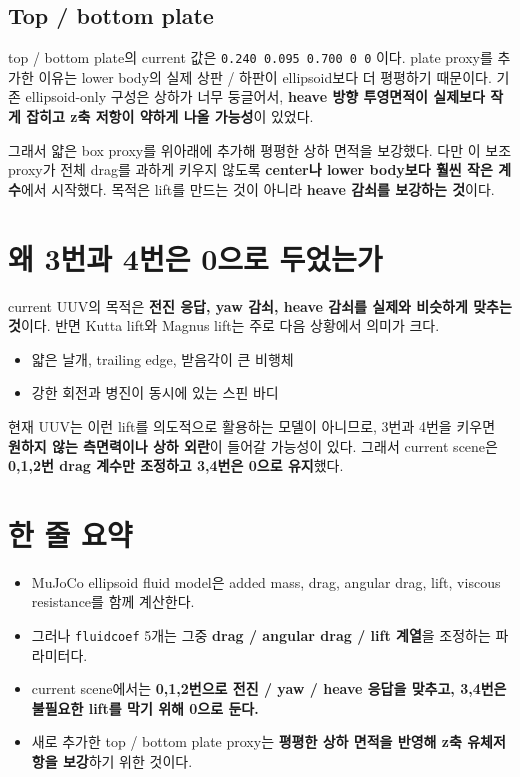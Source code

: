 \documentclass[11pt,a4paper]{article}
\newcommand{\code}[1]{\nolinkurl{#1}}
\begin{document}
\subsection{Top / bottom plate}

top / bottom plate의 current 값은 \code{0.240 0.095 0.700 0 0} 이다. plate proxy를 추가한 이유는 lower body의 실제 상판 / 하판이 ellipsoid보다 더 평평하기 때문이다. 기존 ellipsoid-only 구성은 상하가 너무 둥글어서, \textbf{heave 방향 투영면적이 실제보다 작게 잡히고 z축 저항이 약하게 나올 가능성}이 있었다.

그래서 얇은 box proxy를 위아래에 추가해 평평한 상하 면적을 보강했다. 다만 이 보조 proxy가 전체 drag를 과하게 키우지 않도록 \textbf{center나 lower body보다 훨씬 작은 계수}에서 시작했다. 목적은 lift를 만드는 것이 아니라 \textbf{heave 감쇠를 보강하는 것}이다.

\section{왜 3번과 4번은 0으로 두었는가}

current UUV의 목적은 \textbf{전진 응답, yaw 감쇠, heave 감쇠를 실제와 비슷하게 맞추는 것}이다. 반면 Kutta lift와 Magnus lift는 주로 다음 상황에서 의미가 크다.

\begin{itemize}[leftmargin=2em]
  \item 얇은 날개, trailing edge, 받음각이 큰 비행체
  \item 강한 회전과 병진이 동시에 있는 스핀 바디
\end{itemize}

현재 UUV는 이런 lift를 의도적으로 활용하는 모델이 아니므로, 3번과 4번을 키우면 \textbf{원하지 않는 측면력이나 상하 외란}이 들어갈 가능성이 있다. 그래서 current scene은 \textbf{0,1,2번 drag 계수만 조정하고 3,4번은 0으로 유지}했다.

\section{한 줄 요약}

\begin{itemize}[leftmargin=2em]
  \item MuJoCo ellipsoid fluid model은 added mass, drag, angular drag, lift, viscous resistance를 함께 계산한다.
  \item 그러나 \code{fluidcoef} 5개는 그중 \textbf{drag / angular drag / lift 계열}을 조정하는 파라미터다.
  \item current scene에서는 \textbf{0,1,2번으로 전진 / yaw / heave 응답을 맞추고, 3,4번은 불필요한 lift를 막기 위해 0으로 둔다.}
  \item 새로 추가한 top / bottom plate proxy는 \textbf{평평한 상하 면적을 반영해 z축 유체저항을 보강}하기 위한 것이다.
\end{itemize}
\end{document}
